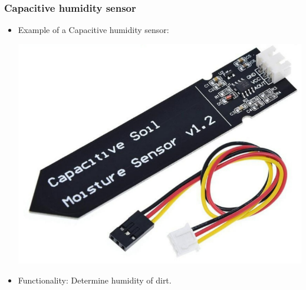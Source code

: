 \documentclass[12pt]{article}
\begin{document}
        \subsubsection{Capacitive humidity sensor}
            \begin{itemize}
                \item Example of a Capacitive humidity sensor:
                \begin{center}
                    \includegraphics[scale = 0.5]{./images/hum_sensor.png}
                \end{center}

                \item Functionality: Determine humidity of dirt.
            \end{itemize}
    \newpage
\end{document}

